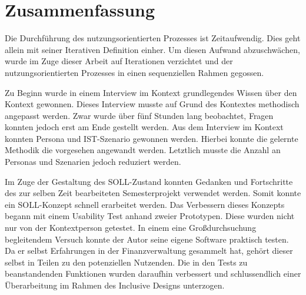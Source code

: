 \section{Zusammenfassung}

Die Durchführung des nutzungsorientierten Prozesses ist Zeitaufwendig.
Dies geht allein mit seiner Iterativen Definition einher.
Um diesen Aufwand abzuschwächen, wurde im Zuge dieser Arbeit auf Iterationen verzichtet und der nutzungsorientierten Prozesses in einen sequenziellen Rahmen gegossen.

Zu Beginn wurde in einem Interview im Kontext grundlegendes Wissen über den Kontext gewonnen.
Dieses Interview musste auf Grund des Kontextes methodisch angepasst werden.
Zwar wurde über fünf Stunden lang beobachtet, Fragen konnten jedoch erst am Ende gestellt werden.
Aus dem Interview im Kontext konnten Persona und IST-Szenario gewonnen werden.
Hierbei konnte die gelernte Methodik die vorgesehen angewandt werden.
Letztlich musste die Anzahl an Personas und Szenarien jedoch reduziert werden.

Im Zuge der Gestaltung des SOLL-Zustand konnten Gedanken und Fortschritte des zur selben Zeit bearbeiteten Semesterprojekt verwendet werden.
Somit konnte ein SOLL-Konzept schnell erarbeitet werden.
Das Verbessern dieses Konzepts begann mit einem Usability Test anhand zweier Prototypen.
Diese wurden nicht nur von der Kontextperson getestet.
In einem eine Großdurchsuchung begleitendem Versuch konnte der Autor seine eigene Software praktisch testen.
Da er selbst Erfahrungen in der Finanzverwaltung gesammelt hat, gehört dieser selbst in Teilen zu den potenziellen  Nutzenden.
Die in den Tests zu beanstandenden Funktionen wurden daraufhin verbessert und schlussendlich einer Überarbeitung im Rahmen des Inclusive Designs unterzogen.